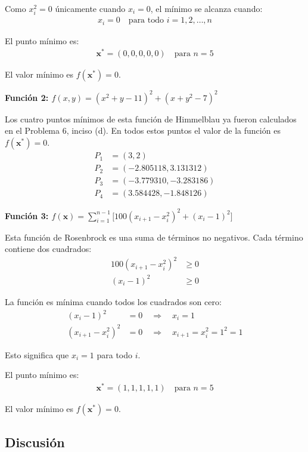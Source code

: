 \documentclass{article}
\begin{document}
Como $x_i^2 = 0$ únicamente cuando $x_i = 0$, el mínimo se alcanza cuando:
\begin{align}
x_i = 0 \quad \text{para todo } i = 1, 2, \ldots, n
\end{align}

El punto mínimo es:
\begin{align}
\mathbf{x}^* = (0, 0, 0, 0, 0) \quad \text{para } n = 5
\end{align}

El valor mínimo es $f(\mathbf{x}^*) = 0$.

\textbf{Función 2: $f(x,y) = (x^{2}+y-11)^{2} + (x+y^{2}-7)^{2}$}

Los cuatro puntos mínimos de esta función de Himmelblau ya fueron calculados en el Problema 6, inciso (d). En todos estos puntos el valor de la función es $f(\mathbf{x}^*) = 0$.
\begin{align}
P_1 &= (3, 2) \\
P_2 &= (-2.805118, 3.131312) \\
P_3 &= (-3.779310, -3.283186) \\
P_4 &= (3.584428, -1.848126)
\end{align}

\textbf{Función 3: $f(\mathbf{x}) = \sum_{i=1}^{n-1} \bigl[100(x_{i+1}-x_i^{2})^{2} + (x_i-1)^{2}\bigr]$}

Esta función de Rosenbrock es una suma de términos no negativos. Cada término contiene dos cuadrados:
\begin{align}
100(x_{i+1} - x_i^2)^2 &\geq 0 \\
(x_i - 1)^2 &\geq 0
\end{align}

La función es mínima cuando todos los cuadrados son cero:
\begin{align}
(x_i - 1)^2 &= 0 \quad \Rightarrow \quad x_i = 1 \\
(x_{i+1} - x_i^2)^2 &= 0 \quad \Rightarrow \quad x_{i+1} = x_i^2 = 1^2 = 1
\end{align}

Esto significa que $x_i = 1$ para todo $i$.

El punto mínimo es:
\begin{align}
\mathbf{x}^* = (1, 1, 1, 1, 1) \quad \text{para } n = 5
\end{align}

El valor mínimo es $f(\mathbf{x}^*) = 0$.

\subsection{Discusión}
\end{document}
